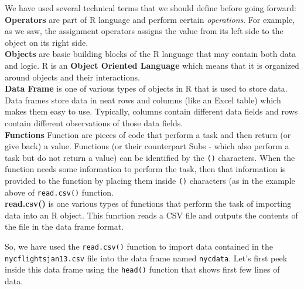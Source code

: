 \documentclass[10pt, letterpaper, twoside]{memoir}\usepackage{knitr}
\begin{document}
We have used several technical terms that we should define before going forward:\\
\textbf{Operators} are part of R language and perform certain \textit{operations}. For example, as we saw, the assignment operators assigns the value from its left side to the object on its right side.\\
\textbf{Objects} are basic building blocks of the R language that may contain both data and logic. R is an \textbf{Object Oriented Language} which means that it is organized around objects and their interactions.\\
\textbf{Data Frame} is one of various types of objects in R that is used to store data. Data frames store data in neat rows and columns (like an Excel table) which makes them easy to use. Typically, columns contain different data fields and rows contain different observations of those data fields.\\
\textbf{Functions} Function are pieces of code that perform a task and then return (or give back) a value. Functions (or their counterpart Subs - which also perform a task but do not return a value) can be identified by the \texttt{()} characters. When the function needs some information to perform the task, then that information is provided to the function by placing them inside \texttt{()} characters (as in the example above of \texttt{read.csv()} function.\\ 
\textbf{read.csv()} is one various types of functions that perform the task of importing data into an R object. This function reads a CSV file and outputs the contents of the file in the data frame format.

So, we have used the \texttt{read.csv()} function to import data contained in the \texttt{nycflightsjan13.csv} file into the data frame named \texttt{nycdata}. Let's first peek inside this data frame using the \texttt{head()}  function that shows first few lines of data.
\end{document}
